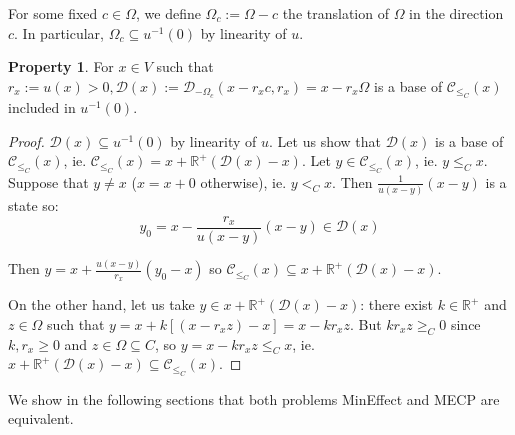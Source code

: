 \documentclass{article}
\theoremstyle{definition}
\newtheorem{prop}[theo]{Property}
\theoremstyle{remark}
\begin{document}
For some fixed $c \in \Omega$, we define $\Omega_c := \Omega - c$ the translation of $\Omega$ in the direction $c$. In particular, $\Omega_c \subseteq u^{-1}(0)$ by linearity of $u$.

\begin{prop}
  For $x \in V$ such that $r_x := u(x) > 0,  \mathcal{D}(x):=\mathcal{D}_{-\Omega_c}(x - r_xc ,r_x) = x - r_x\Omega$ is a base of $\mathcal{C}_{\leq_C}(x)$  included in $u^{-1}(0)$. 
  \label{propbase}
\end{prop}

\begin{proof}
  $\mathcal{D}(x) \subseteq u^{-1}(0)$ by linearity of $u$. Let us show that $\mathcal{D}(x)$ is a base of $\mathcal{C}_{\leq_C}(x)$, ie. $\mathcal{C}_{\leq_C}(x)=x+\mathbb{R}^+(\mathcal{D}(x)-x)$. Let $y \in \mathcal{C}_{\leq_C}(x)$, ie. $y \leq_C x$. Suppose that $y \not= x$ ($x = x + 0$ otherwise), ie. $y <_C x$. Then $\frac{1}{u(x-y)}(x-y)$ is a state so:
  \[y_0 = x - \frac{r_x}{u(x-y)}(x-y) \in \mathcal{D}(x)\]

  Then $y = x + \frac{u(x-y)}{r_x}(y_0-x)$ so $\mathcal{C}_{\leq_C}(x) \subseteq x+\mathbb{R}^+(\mathcal{D}(x)-x)$.

  On the other hand, let us take $y \in x+\mathbb{R}^+(\mathcal{D}(x)-x)$: there exist $k \in \mathbb{R}^+$ and $z \in \Omega$ such that $y = x + k[(x-r_xz)-x] = x - kr_xz$. But $kr_xz \geq_C 0$ since $k,r_x \geq 0$ and $z \in \Omega \subseteq C$, so $y = x - kr_xz \leq_C x$, ie. $x+\mathbb{R}^+(\mathcal{D}(x)-x) \subseteq \mathcal{C}_{\leq_C}(x)$.
\end{proof}

We show in the following sections that both problems MinEffect and MECP are equivalent.
\end{document}
